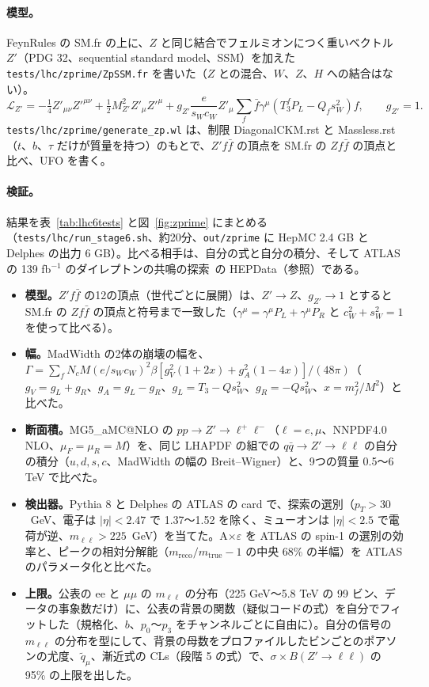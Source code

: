 \documentclass[a4paper,10pt]{ltjsarticle}
\makeatletter
\newcommand{\MGaMC}{MG5\_aMC@NLO}
\makeatother
\begin{document}
\paragraph{模型。}FeynRules の SM.fr の上に、$Z$ と同じ結合でフェルミオンにつく重いベクトル $Z'$（PDG 32、sequential standard model、SSM）を加えた \nolinkurl{tests/lhc/zprime/ZpSSM.fr} を書いた（$Z$ との混合、$W$、$Z$、$H$ への結合はない）。
\[
\mathcal L_{Z'}=-\tfrac14Z'_{\mu\nu}Z'^{\mu\nu}+\tfrac12M_{Z'}^2Z'_\mu Z'^\mu+g_{Z'}\frac e{s_Wc_W}Z'_\mu\sum_f\bar f\gamma^\mu(T_3^fP_L-Q_fs_W^2)f,\qquad g_{Z'}=1 .
\]
\nolinkurl{tests/lhc/zprime/generate_zp.wl} は、制限 DiagonalCKM.rst と Massless.rst（$t$、$b$、$\tau$ だけが質量を持つ）のもとで、$Z'f\bar f$ の頂点を SM.fr の $Zf\bar f$ の頂点と比べ、UFO を書く。

\paragraph{検証。}結果を表~\ref{tab:lhc6tests} と図~\ref{fig:zprime} にまとめる（\nolinkurl{tests/lhc/run_stage6.sh}、約20分、\texttt{out/zprime} に HepMC 2.4 GB と Delphes の出力 6 GB）。比べる相手は、自分の式と自分の積分、そして ATLAS の 139 fb$^{-1}$ のダイレプトンの共鳴の探索~\cite{atlasll}の HEPData（参照）である。
\begin{itemize}
\item \textbf{模型。}$Z'f\bar f$ の12の頂点（世代ごとに展開）は、$Z'\to Z$、$g_{Z'}\to1$ とすると SM.fr の $Zf\bar f$ の頂点と符号まで一致した（$\gamma^\mu=\gamma^\mu P_L+\gamma^\mu P_R$ と $c_W^2+s_W^2=1$ を使って比べる）。
\item \textbf{幅。}MadWidth の2体の崩壊の幅を、$\Gamma=\sum_f N_cM(e/s_Wc_W)^2\beta[g_V^2(1+2x)+g_A^2(1-4x)]/(48\pi)$（$g_V=g_L+g_R$、$g_A=g_L-g_R$、$g_L=T_3-Qs_W^2$、$g_R=-Qs_W^2$、$x=m_f^2/M^2$）と比べた。
\item \textbf{断面積。}\MGaMC{} の $pp\to Z'\to\ell^+\ell^-$（$\ell=e,\mu$、NNPDF4.0 NLO、$\mu_F=\mu_R=M$）を、同じ LHAPDF の組での $q\bar q\to Z'\to\ell\ell$ の自分の積分（$u,d,s,c$、MadWidth の幅の Breit--Wigner）と、9つの質量 0.5〜6 TeV で比べた。
\item \textbf{検出器。}Pythia 8 と Delphes の ATLAS の card で、探索の選別（$p_T>30$~GeV、電子は $|\eta|<2.47$ で 1.37〜1.52 を除く、ミューオンは $|\eta|<2.5$ で電荷が逆、$m_{\ell\ell}>225$~GeV）を当てた。A$\times\varepsilon$ を ATLAS の spin-1 の選別の効率と、ピークの相対分解能（$m_{\mathrm{reco}}/m_{\mathrm{true}}-1$ の中央 68\% の半幅）を ATLAS のパラメータ化と比べた。
\item \textbf{上限。}公表の ee と $\mu\mu$ の $m_{\ell\ell}$ の分布（225 GeV〜5.8 TeV の 99 ビン、データの事象数だけ）に、公表の背景の関数（疑似コードの式）を自分でフィットした（規格化、$b$、$p_0$〜$p_3$ をチャンネルごとに自由に）。自分の信号の $m_{\ell\ell}$ の分布を型にして、背景の母数をプロファイルしたビンごとのポアソンの尤度、$\tilde q_\mu$、漸近式の CLs（段階 5 の式）で、$\sigma\times B(Z'\to\ell\ell)$ の 95\% の上限を出した。
\end{itemize}
\end{document}

